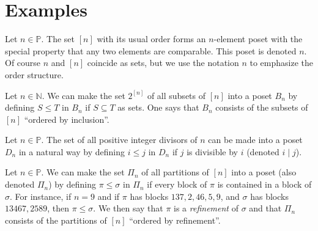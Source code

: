 \section{Examples}


\begin{example}
\label{ex:poset:def}

\item \label{ex:poset:def:a} Let $n \in \mathbb{P}$. The set $[n]$ with its usual order forms an $n$-element poset with the special property that any two elements are comparable. This poset is denoted $n$. Of course $n$ and $[n]$ coincide as sets, but we use the notation $n$ to emphasize the order structure. \cite{Stanley:2011:ECV:2124415}

\item \label{ex:poset:def:b} Let $n \in \mathbb{N}$. We can make the set $2^{[n]}$ of all subsets of $[n]$ into a poset $B_n$ by defining $S \leq T$ in $B_n$ if $S \subseteq T$ as sets. One says that $B_n$ consists of the subsets of $[n]$ ``ordered by inclusion''. \cite{Stanley:2011:ECV:2124415}

\item \label{ex:poset:def:c}  Let $n \in \mathbb{P}$. The set of all positive integer divisors of $n$ can be made into a poset $D_n$ in a natural way by defining $i \leq j$ in $D_n$ if $j$ is divisible by $i$ (denoted $i \mid j$). \cite{Stanley:2011:ECV:2124415}

\item \label{ex:poset:def:d}  Let $n \in \mathbb{P}$. We can make the set $\Pi_n$ of all partitions of $[n]$ into a poset (also denoted $\Pi_n$) by defining $\pi \leq \sigma$ in $\Pi_n$ if every block of $\pi$ is contained in a block of $\sigma$. For instance, if $n = 9$ and if $\pi$ has blocks $137, 2, 46, 5, 9$, and $\sigma$ has blocks $13467, 2589$, then $\pi \leq \sigma$. We then say that $\pi$ is a \emph{refinement} of $\sigma$ and that $\Pi_n$ consists of the partitions of $[n]$ ``ordered by refinement''. \cite{Stanley:2011:ECV:2124415}
\end{example}